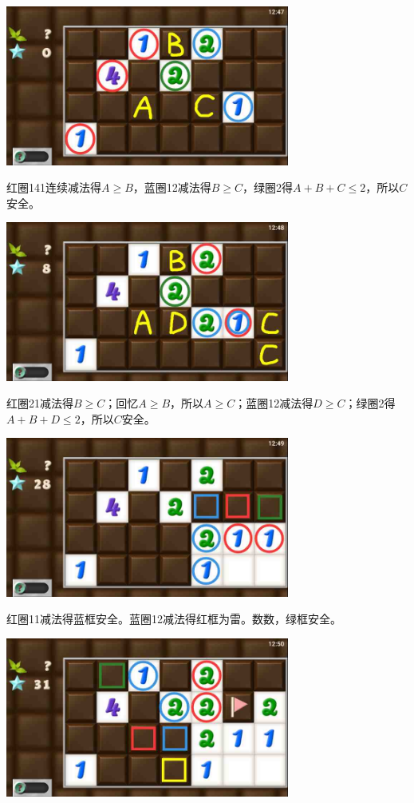 \subsection{} %
\begin{center}
    \includegraphics[width=0.7\textwidth]{puzzlelow/226-1.jpg}
\end{center}
红圈141连续减法得$A\ge B$，蓝圈12减法得$B\ge C$，绿圈2得$A+B+C\le 2$，所以$C$安全。
\begin{center}
    \includegraphics[width=0.7\textwidth]{puzzlelow/226-2.jpg}
\end{center}
红圈21减法得$B\ge C$；回忆$A\ge B$，所以$A\ge C$；蓝圈12减法得$D\ge C$；绿圈2得$A+B+D\le 2$，所以$C$安全。
\begin{center}
    \includegraphics[width=0.7\textwidth]{puzzlelow/226-3.jpg}
\end{center}
红圈11减法得蓝框安全。蓝圈12减法得红框为雷。数数，绿框安全。
\begin{center}
    \includegraphics[width=0.7\textwidth]{puzzlelow/226-4.jpg}
\end{center}

